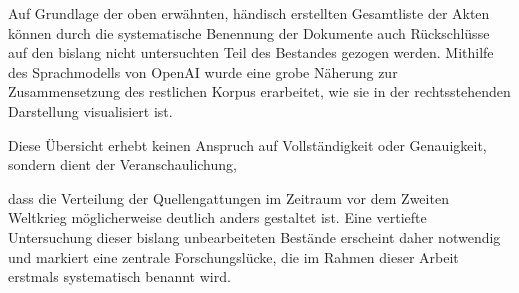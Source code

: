 \documentclass[12pt, a4paper, ngerman, bidi=default]{article}
\begin{document}
\par\vspace{0.06cm}
\noindent
\begin{minipage}[t]{0.48\textwidth}
  \justifying
  Auf Grundlage der oben erwähnten, händisch erstellten Gesamtliste der Akten können durch 
  die systematische Benennung der Dokumente auch Rückschlüsse auf den bislang nicht untersuchten 
  Teil des Bestandes gezogen werden. Mithilfe des Sprachmodells von OpenAI wurde eine grobe Näherung zur 
  Zusammensetzung des restlichen Korpus erarbeitet, wie sie in der rechtsstehenden Darstellung visualisiert ist.
  
  Diese Übersicht erhebt keinen Anspruch auf Vollständigkeit oder Genauigkeit, sondern dient der Veranschaulichung, 

\end{minipage}%
\hfill
\begin{minipage}[t]{0.48\textwidth}
  \centering
  \vspace*{0.2cm} %
  
  \label{fig:dokumententypen-schätzung}
\end{minipage}

\vspace{0.4cm}

\noindent
dass die Verteilung der Quellengattungen im Zeitraum vor dem Zweiten Weltkrieg möglicherweise deutlich anders gestaltet ist. Eine vertiefte Untersuchung dieser bislang unbearbeiteten Bestände erscheint daher notwendig und markiert eine zentrale Forschungslücke, die im Rahmen dieser Arbeit erstmals systematisch benannt wird.
\end{document}
